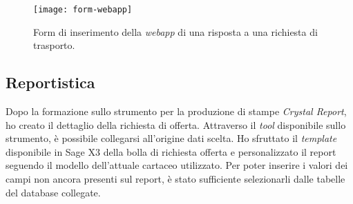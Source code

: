 \begin{figure}[htbp]
	\begin{center}
		\texttt{[image: form-webapp]}
		\caption{Form di inserimento della \textit{webapp} di una risposta a una richiesta di trasporto.}
	\end{center}
\end{figure}

\newpage 
\subsection{Reportistica}
Dopo la formazione sullo strumento per la produzione di stampe \textit{Crystal Report}, ho creato il dettaglio della richiesta di offerta.
Attraverso il \textit{tool} disponibile sullo strumento, è possibile collegarsi all'origine dati scelta.
Ho sfruttato il \textit{template} disponibile in Sage X3 della bolla di richiesta offerta e personalizzato il report seguendo il modello dell'attuale cartaceo utilizzato.
Per poter inserire i valori dei campi non ancora presenti sul report, è stato sufficiente selezionarli dalle tabelle del database collegate.

